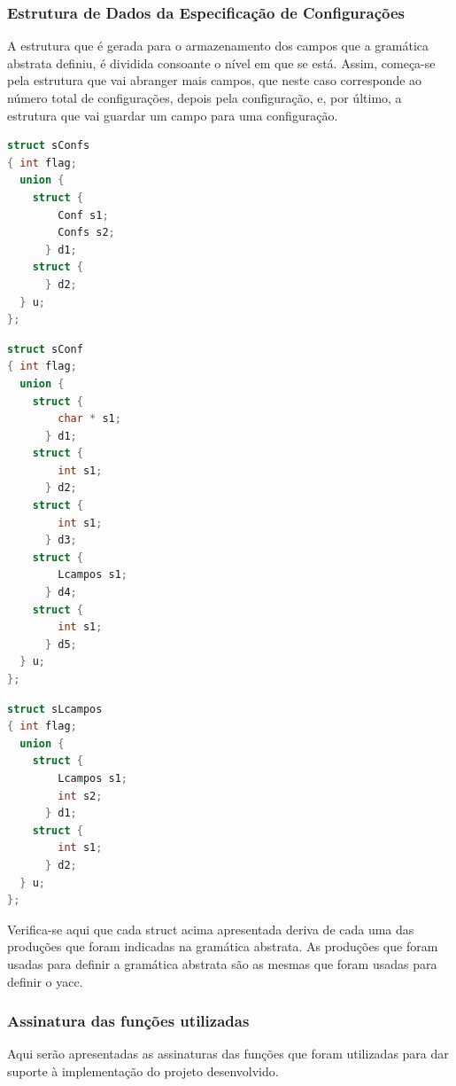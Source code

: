 \documentclass[11pt, a4paper, oneside]{article}
\begin{document}
\subsubsection{Estrutura de Dados da Especificação de Configurações}
A estrutura que é gerada para o armazenamento dos campos que a gramática abstrata definiu, é dividida consoante o nível em que se está. Assim, começa-se pela estrutura que vai abranger mais campos, que neste caso corresponde ao número total de configurações, depois pela configuração, e, por último, a estrutura que vai guardar um campo para uma configuração.

\begin{lstlisting}[language=C, caption={Estrutura de dados para armazenar as configurações.}]
struct sConfs 
{ int flag;
  union {  
    struct {
        Conf s1;
        Confs s2;
      } d1;
    struct {
      } d2;
  } u;
};
\end{lstlisting}
\newpage
\begin{lstlisting}[language=C, caption={Estrutura de dados que armazena uma configuração.}]
struct sConf 
{ int flag;
  union {  
    struct {
        char * s1;
      } d1;
    struct {
        int s1;
      } d2;
    struct {
        int s1;
      } d3;
    struct {
        Lcampos s1;
      } d4;
    struct {
        int s1;
      } d5;
  } u;
};
\end{lstlisting}

\begin{lstlisting}[language=C, caption={Estrututura de dados que armazena os campos de uma configuração.}]
struct sLcampos 
{ int flag;
  union {  
    struct {
        Lcampos s1;
        int s2;
      } d1;
    struct {
        int s1;
      } d2;
  } u;
};
\end{lstlisting}

Verifica-se aqui que cada \textsf{struct} acima apresentada deriva de cada uma das produções que foram indicadas na gramática abstrata.
As produções que foram usadas para definir a gramática abstrata são as mesmas que foram usadas para definir o \textsf{yacc}.
\newpage

\subsubsection{Assinatura das funções utilizadas}
Aqui serão apresentadas as assinaturas das funções que foram utilizadas para dar suporte à implementação do projeto desenvolvido.
\end{document}
